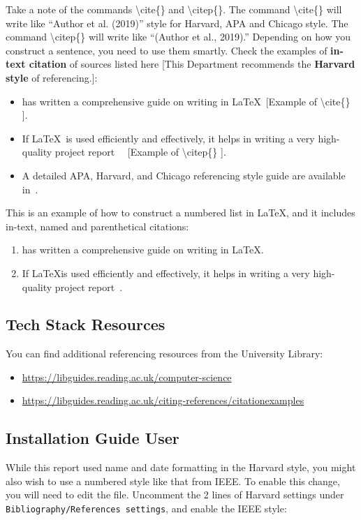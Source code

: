 Take a note of the commands \textbackslash cite\{\} and \textbackslash citep\{\}. The command \textbackslash cite\{\} will write like ``Author et al. (2019)'' style for Harvard, APA and Chicago style. The command \textbackslash citep\{\} will write like ``(Author et al., 2019).'' Depending on how you construct a sentence, you need to use them smartly. Check the examples of \textbf{in-text citation} of sources listed here [This Department recommends the \textbf{Harvard style} of referencing.]:
\begin{itemize}
    \item \cite{kottwitzlatex2021} has written a comprehensive guide on writing in \LaTeX ~[Example of \textbackslash cite\{\} ].
    \item If \LaTeX~is used efficiently and effectively, it helps in writing a very high-quality project report~\citep{lamport1994latex} ~[Example of \textbackslash citep\{\} ].   
    \item A detailed APA, Harvard, and Chicago referencing style guide are available in~\citep{uor_refernce_style}.
\end{itemize}


\noindent 
This is an example of how to construct a numbered list in \LaTeX, and it includes in-text, named and parenthetical citations:
\begin{enumerate}
    \item \cite{kottwitzlatex2021} has written a comprehensive guide on writing in \LaTeX.
    \item If \LaTeX is used efficiently and effectively, it helps in writing a very high-quality project report~\citep{lamport1994latex}.   
\end{enumerate}

\subsection{Tech Stack Resources}\label{subsec:reflinks}
You can find additional referencing resources from the University Library:
\begin{itemize}
    \item \url{https://libguides.reading.ac.uk/computer-science}
    \item \url{https://libguides.reading.ac.uk/citing-references/citationexamples}
\end{itemize}

\subsection{Installation Guide User}
While this report used name and date formatting in the Harvard style, you might also wish to use a numbered style like that from IEEE.  To enable this change, you will need to edit the  file.  Uncomment the 2 lines of Harvard settings under \texttt{Bibliography/References settings}, and enable the IEEE style:

